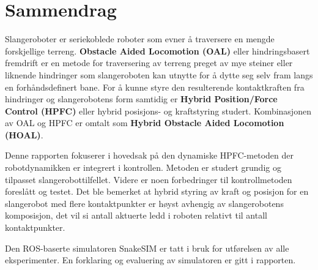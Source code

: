 \chapter{Sammendrag}




Slangeroboter er seriekoblede roboter som evner å traversere en mengde forskjellige terreng. \textbf{Obstacle Aided Locomotion (OAL)} eller hindringsbasert fremdrift er en metode for traversering av terreng preget av mye steiner eller liknende hindringer som slangeroboten kan utnytte for å dytte seg selv fram langs en forhåndsdefinert bane. For å kunne styre den resulterende kontaktkraften fra hindringer og slangerobotens form samtidig er \textbf{Hybrid Position/Force Control (HPFC)} eller hybrid posisjons- og kraftstyring studert. Kombinasjonen av OAL og HPFC er omtalt som \textbf{Hybrid Obstacle Aided Locomotion (HOAL)}.

Denne rapporten fokuserer i hovedsak på den dynamiske HPFC-metoden der robotdynamikken er integrert i kontrollen. Metoden er studert grundig og tilpasset slangerobottilfellet. Videre er noen forbedringer til kontrollmetoden foreslått og testet. Det ble bemerket at hybrid styring av kraft og posisjon for en slangerobot med flere kontaktpunkter er høyst avhengig av slangerobotens komposisjon, det vil si antall aktuerte ledd i roboten relativt til antall kontaktpunkter.

Den ROS-baserte simulatoren SnakeSIM er tatt i bruk for utførelsen av alle eksperimenter. En forklaring og evaluering av simulatoren er gitt i rapporten.


\makeatletter
{}


\makeatother







